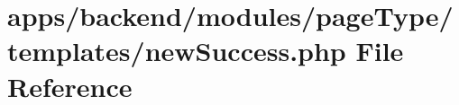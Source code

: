 \hypertarget{backend_2modules_2page_type_2templates_2new_success_8php}{\section{apps/backend/modules/page\-Type/templates/new\-Success.php File Reference}
\label{backend_2modules_2page_type_2templates_2new_success_8php}
}
